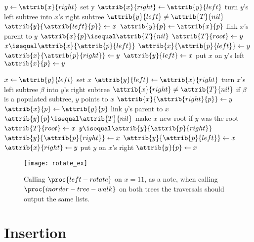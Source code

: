 \documentclass[12pt]{article}
\begin{document}
\begin{codebox}
\li $y \gets{\attrib{x}{right}}$ \Comment set y
\li $\attrib{x}{right} \gets{\attrib{y}{left}}$ \Comment turn $y$'s left subtree into $x$'s right subtree
\li \If $\attrib{y}{left} \neq \attrib{T}{nil}$
\li \Then
        $\attrib{y}{\attrib{left}{p}} \gets{x}$
    \End
\li $\attrib{y}{p} \gets{\attrib{x}{p}}$ \Comment link $x$'s parent to $y$
\li \If $\attrib{x}{p} \isequal \attrib{T}{nil}$
\li \Then
        $\attrib{T}{root} \gets{y}$
\li \ElseIf $x \isequal \attrib{x}{\attrib{p}{left}}$
\li \Then
        $\attrib{x}{\attrib{p}{left}} \gets{y}$
\li \Else
\li     $\attrib{x}{\attrib{p}{right}} \gets{y}$
    \End
\li $\attrib{y}{left} \gets{x}$ \Comment put $x$ on $y$'s left
\li $\attrib{x}{p} \gets{y}$
\end{codebox}

\begin{codebox}
\li $x \gets{\attrib{y}{left}}$ \Comment set $x$
\li $\attrib{y}{left} \gets{\attrib{x}{right}}$ \Comment turn $x$'s left subtree $\beta$ into $y$'s right subtree
\li \If $\attrib{x}{right} \neq \attrib{T}{nil}$ \Comment if $\beta$ is a populated subtree, $y$ points to $x$
\li \Then
        $\attrib{x}{\attrib{right}{p}} \gets{y}$
    \End
\li $\attrib{x}{p} \gets{\attrib{y}{p}}$ \Comment link $y$'s parent to $x$
\li \If $\attrib{y}{p} \isequal \attrib{T}{nil}$ \Comment make $x$ new root if $y$ was the root
\li \Then
        $\attrib{T}{root} \gets{x}$
\li \ElseIf $y \isequal \attrib{y}{\attrib{p}{right}}$
\li \Then
        $\attrib{y}{\attrib{p}{right}} \gets{x}$
\li \Else
\li     $\attrib{y}{\attrib{p}{left}} \gets{x}$
    \End
\li $\attrib{x}{right} \gets{y}$ \Comment put $y$ on $x$'s right
\li $\attrib{y}{p} \gets{x}$
\end{codebox}

\begin{figure}[!ht]
\texttt{[image: rotate\_ex]}
\caption{
    Calling $\proc{left-rotate}$ on $x=11$, as a note, when calling $\proc{inorder-tree-walk}$ on both trees the traversals should output the same lists.
}
\label{fig: rbt3}
\end{figure}

\newpage

\section*{Insertion}
\end{document}
